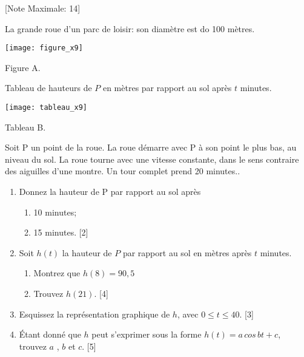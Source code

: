 \begin{question}
  \hspace*{\fill} [Note Maximale: 14]\par
  \medskip
  \begin{center} %
    \noindent La grande roue d'un parc de loisir: son diamètre est do 100 mètres.\par
    \texttt{[image: figure\_x9]}\par
    \noindent Figure A.\par
  \end{center} %
  \medskip
  \begin{center} %
    \noindent Tableau de hauteurs de $P$ en mètres par rapport au sol après $t$ minutes.\par
    \texttt{[image: tableau\_x9]}\par
    \noindent Tableau B.\par
  \end{center} %

  \noindent Soit P un point de la roue. La roue démarre avec P à son point le plus bas, au niveau
du sol. La roue tourne avec une vitesse constante, dans le sens contraire des aiguilles
d’une montre. Un tour complet prend 20 minutes..\par
  \begin{enumerate}[label=(\alph*)]
  \item Donnez la hauteur de P par rapport au sol après
      \begin{enumerate}[label=(\roman*)]
        \item 10 minutes;
        \item 15 minutes.\hspace*{\fill} [2]
      \end{enumerate}
    \item Soit $h(t)$ la hauteur de $P$ par rapport au sol en mètres après $t$ minutes.
      \begin{enumerate}[label=(\roman*)]
        \item Montrez que $h(8)=90,5$
        \item Trouvez $h(21)$.\hspace*{\fill} [4]
      \end{enumerate}
    \item Esquissez la représentation graphique de $h$, avec $0 \le t \le 40.$\hspace*{\fill} [3]
    \item Étant donné que $h$ peut s’exprimer sous la forme $h(t) = a\,cos\,bt + c$, trouvez $a$ , $b$ et $c$.\hspace*{\fill} [5]
  \end{enumerate}
\end{question}
